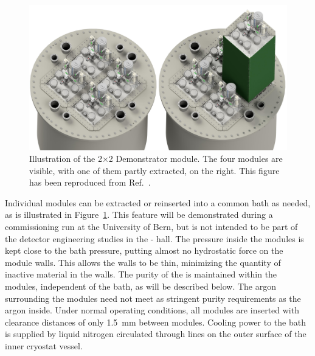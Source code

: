 \begin{figure}[htbp]
	\centering
	\includegraphics[width=\textwidth]{graphics/BathAndModule.jpeg}
	\caption{Illustration of the  2$\times$2 Demonstrator module. The four modules are visible, with one of them partly extracted, on the right. This figure has been reproduced from Ref.~\cite{argoncube_loi}.}
	\label{fig:2x2_extraction}
\end{figure}

Individual modules can be extracted or reinserted into a common  bath as needed, as is illustrated in Figure~\ref{fig:2x2_extraction}. This feature will be demonstrated during a commissioning run at the University of Bern, but is not intended to be part of the detector engineering studies in the - hall. The pressure inside the modules is kept close to the bath pressure, putting almost no hydrostatic force on the module walls.  This allows the walls to be thin, minimizing the quantity of inactive material in the walls. The purity of the  is maintained within the modules, independent of the bath, as will be described below. The argon surrounding the modules need not meet as stringent purity requirements as the argon inside. Under normal operating conditions, all modules are inserted with  clearance distances of only \SI{1.5}{\milli\metre} between modules. Cooling power to the bath is supplied by liquid nitrogen circulated through lines on the outer surface of the inner cryostat vessel.

